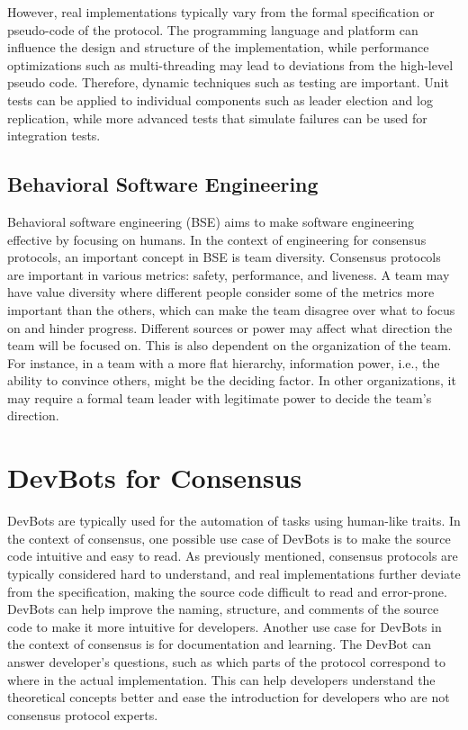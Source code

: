\documentclass[11pt]{article}
\begin{document}
However, real implementations typically vary from the formal specification or pseudo-code of the protocol. The programming language and platform can influence the design and structure of the implementation, while performance optimizations such as multi-threading may lead to deviations from the high-level pseudo code. Therefore, dynamic techniques such as testing are important. Unit tests can be applied to individual components such as leader election and log replication, while more advanced tests that simulate failures can be used for integration tests.

\subsection{Behavioral Software Engineering}
Behavioral software engineering (BSE) aims to make software engineering effective by focusing on humans. In the context of engineering for consensus protocols, an important concept in BSE is team diversity. Consensus protocols are important in various metrics: safety, performance, and liveness. A team may have value diversity where different people consider some of the metrics more important than the others, which can make the team disagree over what to focus on and hinder progress. Different sources or power may affect what direction the team will be focused on. This is also dependent on the organization of the team. For instance, in a team with a more flat hierarchy, information power, i.e., the ability to convince others, might be the deciding factor. In other organizations, it may require a formal team leader with legitimate power to decide the team's direction.

\section{DevBots for Consensus}
DevBots are typically used for the automation of tasks using human-like traits. In the context of consensus, one possible use case of DevBots is to make the source code intuitive and easy to read. As previously mentioned, consensus protocols are typically considered hard to understand, and real implementations further deviate from the specification, making the source code difficult to read and error-prone. DevBots can help improve the naming, structure, and comments of the source code to make it more intuitive for developers. Another use case for DevBots in the context of consensus is for documentation and learning. The DevBot can answer developer's questions, such as which parts of the protocol correspond to where in the actual implementation. This can help developers understand the theoretical concepts better and ease the introduction for developers who are not consensus protocol experts.
\end{document}
